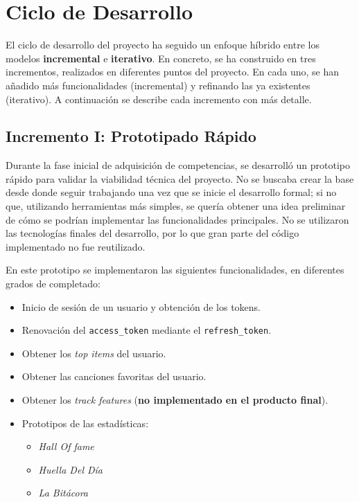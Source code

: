 \section{Ciclo de Desarrollo}

El ciclo de desarrollo del proyecto ha seguido un enfoque híbrido entre los modelos \textbf{incremental} e \textbf{iterativo}. En concreto, se ha construido en tres incrementos, realizados en diferentes puntos del proyecto. En cada uno, se han añadido más funcionalidades (incremental) y refinando las ya existentes (iterativo). A continuación se describe cada incremento con más detalle.

\subsection*{Incremento I: Prototipado Rápido}

Durante la fase inicial de adquisición de competencias, se desarrolló un prototipo rápido para validar la viabilidad técnica del proyecto. No se buscaba crear la base desde donde seguir trabajando una vez que se inicie el desarrollo formal; si no que, utilizando herramientas más simples, se quería obtener una idea preliminar de cómo se podrían implementar las funcionalidades principales. No se utilizaron las tecnologías finales del desarrollo, por lo que gran parte del código implementado no fue reutilizado.

En este prototipo se implementaron las siguientes funcionalidades, en diferentes grados de completado:
\setlength{\itemsep}{0pt}
\begin{itemize}
    \item Inicio de sesión de un usuario y obtención de los tokens.
    \item Renovación del \texttt{access\_token} mediante el \texttt{refresh\_token}.
    \item Obtener los \textit{top items} del usuario.
    \item Obtener las canciones favoritas del usuario.
    \item Obtener los \textit{track features} (\textbf{no implementado en el producto final}).
    \item Prototipos de las estadísticas:
          \begin{itemize}
              \item \textit{Hall Of fame}
              \item \textit{Huella Del Día}
              \item \textit{La Bitácora}
          \end{itemize}
\end{itemize}

